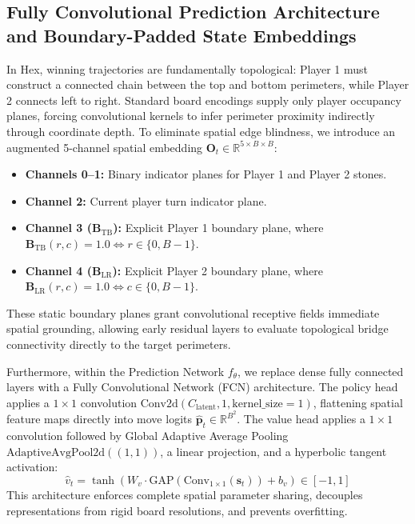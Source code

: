 \documentclass[12pt,a4paper]{article}
\begin{document}
\subsection{Fully Convolutional Prediction Architecture and Boundary-Padded State Embeddings}
In Hex, winning trajectories are fundamentally topological: Player 1 must construct a connected chain between the top and bottom perimeters, while Player 2 connects left to right. Standard board encodings supply only player occupancy planes, forcing convolutional kernels to infer perimeter proximity indirectly through coordinate depth. To eliminate spatial edge blindness, we introduce an augmented 5-channel spatial embedding $\mathbf{O}_t \in \mathbb{R}^{5 \times B \times B}$:
\begin{itemize}
    \item \textbf{Channels 0--1:} Binary indicator planes for Player 1 and Player 2 stones.
    \item \textbf{Channel 2:} Current player turn indicator plane.
    \item \textbf{Channel 3 ($\mathbf{B}_{\text{TB}}$):} Explicit Player 1 boundary plane, where $\mathbf{B}_{\text{TB}}(r, c) = 1.0 \iff r \in \{0, B-1\}$.
    \item \textbf{Channel 4 ($\mathbf{B}_{\text{LR}}$):} Explicit Player 2 boundary plane, where $\mathbf{B}_{\text{LR}}(r, c) = 1.0 \iff c \in \{0, B-1\}$.
\end{itemize}
These static boundary planes grant convolutional receptive fields immediate spatial grounding, allowing early residual layers to evaluate topological bridge connectivity directly to the target perimeters.

Furthermore, within the Prediction Network $f_\theta$, we replace dense fully connected layers with a Fully Convolutional Network (FCN) architecture. The policy head applies a $1 \times 1$ convolution $\text{Conv2d}(C_{\text{latent}}, 1, \text{kernel\_size}=1)$, flattening spatial feature maps directly into move logits $\hat{\mathbf{p}}_t \in \mathbb{R}^{B^2}$. The value head applies a $1 \times 1$ convolution followed by Global Adaptive Average Pooling $\text{AdaptiveAvgPool2d}((1, 1))$, a linear projection, and a hyperbolic tangent activation:
\begin{equation}
    \hat{v}_t = \tanh\left( W_v \cdot \text{GAP}(\text{Conv}_{1\times 1}(\mathbf{s}_t)) + b_v \right) \in [-1, 1]
\end{equation}
This architecture enforces complete spatial parameter sharing, decouples representations from rigid board resolutions, and prevents overfitting.
\end{document}

